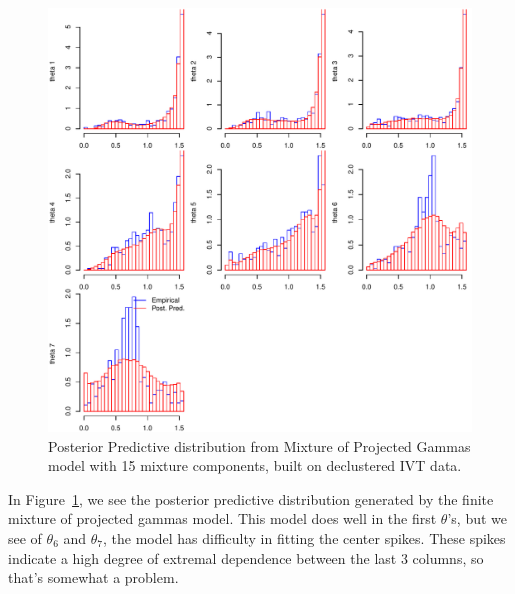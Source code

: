 \begin{figure}[h!]
  \label{fig:mpg}
  \centering
  \caption{Posterior Predictive distribution from Mixture of Projected Gammas model with
            15 mixture components, built on declustered IVT data.}
  \includegraphics[width=6in]{./images/mpg_15_emp_v_pred_decluster}
\end{figure}

In Figure~\ref{fig:mpg}, we see the posterior predictive distribution generated by the finite
  mixture of projected gammas model.  This model does well in the first $\theta$'s, but we see
  of $\theta_6$ and $\theta_7$, the model has difficulty in fitting the center spikes.  These
  spikes indicate a high degree of extremal dependence between the last 3 columns, so that's
  somewhat a problem.

